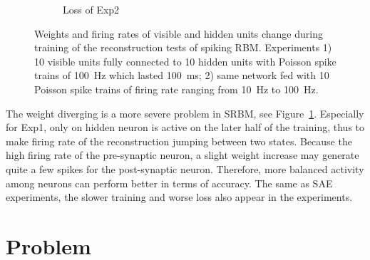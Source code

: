 \begin{figure}
\begin{subfigure}[t]{0.45\textwidth}
		\caption{Loss of Exp2}
	\end{subfigure}
	\caption{Weights and firing rates of visible and hidden units change during training of the reconstruction tests of spiking RBM. 
		Experiments 1) 10 visible units fully connected to 10 hidden units with Poisson spike trains of 100~Hz which lasted 100~ms; 2) same network fed with 10 Poisson spike trains of firing rate ranging from 10~Hz to 100~Hz.}
\label{fig:srbm_orig}
\end{figure}

The weight diverging is a more severe problem in SRBM, see Figure~\ref{fig:srbm_orig}.
Especially for Exp1, only on hidden neuron is active on the later half of the training, thus to make firing rate of the reconstruction jumping between two states.
Because the high firing rate of the pre-synaptic neuron, a slight weight increase may generate quite a few spikes for the post-synaptic neuron.
Therefore, more balanced activity among neurons can perform better in terms of accuracy.
The same as SAE experiments, the slower training and worse loss also appear in the experiments.

\section{Problem}
\label{sec:problem}





